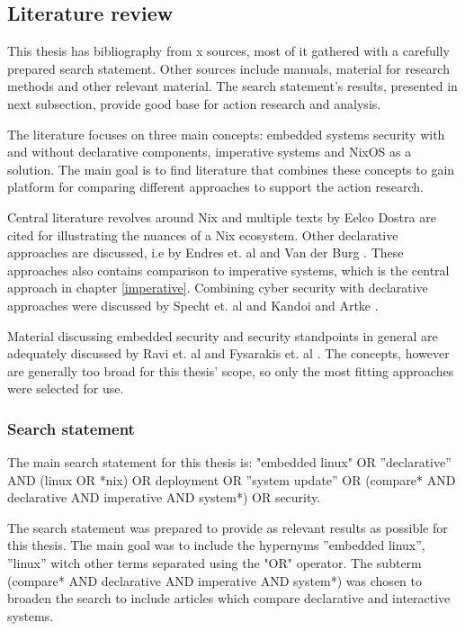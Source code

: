 \subsection{Literature review}\label{litrev}

This thesis has bibliography from x sources, most of it gathered with a carefully prepared search statement. Other sources include manuals, material for research methods and other relevant material. The search statement's results, presented in next subsection, provide good base for action research and analysis.

The literature focuses on three main concepts: embedded systems security with and without declarative components, imperative systems and NixOS as a solution. The main goal is to find literature that combines these concepts to gain platform for comparing different approaches to support the action research. 

Central literature revolves around Nix and multiple texts by Eelco Dostra are cited for illustrating the nuances of a Nix ecosystem. Other declarative approaches are discussed, i.e by Endres et. al and Van der Burg \cite{van2010declarative, endres2017declarative}. These approaches also contains comparison to imperative systems, which is the central approach in chapter \ref{imperative}. Combining cyber security with declarative approaches were discussed by Specht et. al and Kandoi and Artke \cite{specht2007analysis, kandoi2021operating}.

Material discussing embedded security and security standpoints in general are adequately discussed by Ravi et. al and Fysarakis et. al \cite{ravi2004security, fysarakis2014embedded}. The concepts, however are generally too broad for this thesis' scope, so only the most fitting approaches were selected for use.


\subsubsection{Search statement} \label{s-}

The main search statement for this thesis is:
"embedded linux" OR ''declarative'' AND (linux OR *nix) OR deployment OR ''system update'' OR (compare* AND declarative AND imperative AND system*) OR security.

The search statement was prepared to provide as relevant results as possible for this thesis. The main goal was to include the hypernyms ''embedded linux'', ''linux'' witch other terms separated using the "OR" operator. The subterm (compare* AND declarative AND imperative AND system*) was chosen to broaden the search to include articles which compare declarative and interactive systems.

